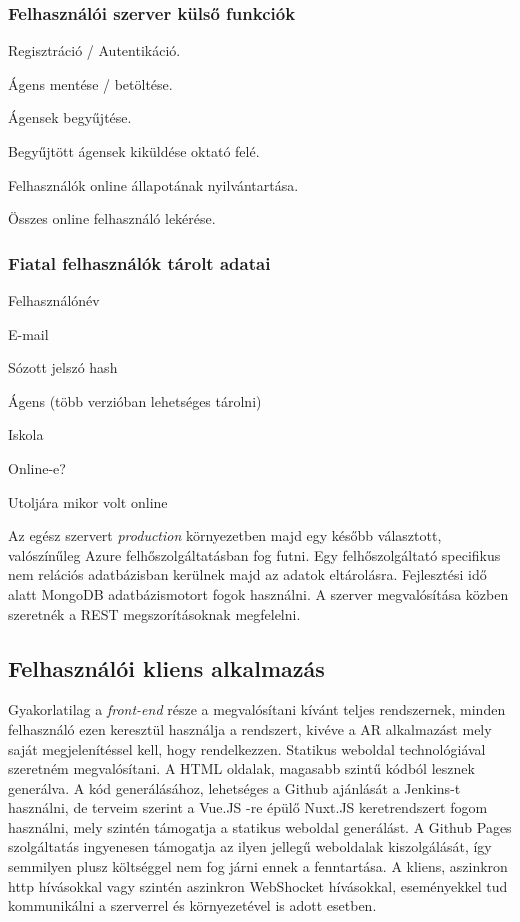 \documentclass[12pt,a4paper,oneside]{report} %
\begin{document}
\subsubsection{Felhasználói szerver külső funkciók}
\begin{compactitem}
	\item Regisztráció / Autentikáció.
	\item Ágens mentése / betöltése.
	\item Ágensek begyűjtése.
	\item Begyűjtött ágensek kiküldése oktató felé.
	\item Felhasználók online állapotának nyilvántartása.
	\item Összes online felhasználó lekérése.
\end{compactitem}
\subsubsection{Fiatal felhasználók tárolt adatai}
\begin{compactitem}
	\item Felhasználónév
	\item E-mail
	\item Sózott jelszó hash
	\item Ágens (több verzióban lehetséges tárolni)
	\item Iskola
	\item Online-e?
	\item Utoljára mikor volt online
\end{compactitem}
Az egész szervert \textit{production} környezetben majd egy később választott, valószínűleg Azure felhőszolgáltatásban fog futni. Egy felhőszolgáltató specifikus nem relációs adatbázisban  kerülnek majd az adatok eltárolásra. Fejlesztési idő alatt MongoDB adatbázismotort fogok használni.
A szerver megvalósítása közben szeretnék  a REST megszorításoknak megfelelni.


\subsection{Felhasználói kliens alkalmazás}
\label{felhkliens}
Gyakorlatilag a \textit{front-end} része a megvalósítani kívánt teljes rendszernek, minden felhasználó ezen keresztül használja a rendszert, kivéve a AR alkalmazást mely saját megjelenítéssel kell, hogy rendelkezzen.
Statikus weboldal technológiával szeretném megvalósítani. A HTML oldalak, magasabb szintű kódból lesznek generálva. A kód generálásához, lehetséges a Github ajánlását a Jenkins-t használni, de terveim szerint a Vue.JS -re épülő Nuxt.JS keretrendszert fogom használni, mely szintén támogatja a statikus weboldal generálást. A Github Pages szolgáltatás ingyenesen támogatja az ilyen jellegű weboldalak kiszolgálását, így semmilyen plusz költséggel nem fog járni ennek a fenntartása. A kliens, aszinkron http hívásokkal vagy szintén aszinkron WebShocket hívásokkal, eseményekkel tud kommunikálni a szerverrel és környezetével is adott esetben.
\end{document}

